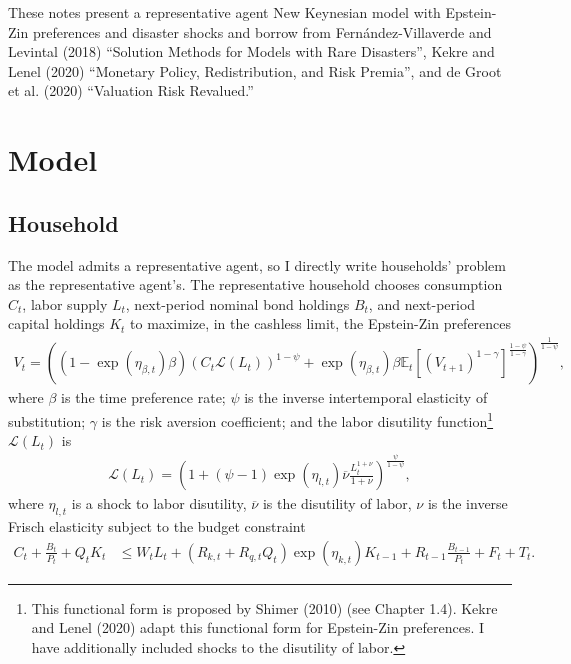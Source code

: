 \documentclass[12 pt, oneside]{article}
\theoremstyle{definition}
\theoremstyle{definition}
\theoremstyle{definition}
\newcommand{\E}{\mathbb{E}}
\newcommand{\calL}{\mathcal{L}}
\begin{document}
These notes present a representative agent New Keynesian model with Epstein-Zin preferences and disaster shocks and borrow from Fern{\'a}ndez-Villaverde and Levintal (2018) ``Solution Methods for Models with Rare Disasters'', Kekre and Lenel (2020) ``Monetary Policy, Redistribution, and Risk Premia'', and de Groot et al. (2020) ``Valuation Risk Revalued.''

\section{Model}\label{sec:model}

\subsection{Household}

The model admits a representative agent, so I directly write households' problem as the representative agent's. The representative household chooses consumption $C_t$, labor supply $L_t$, next-period nominal  bond holdings $B_t$, and next-period capital holdings $K_t$ to maximize, in the cashless limit, the Epstein-Zin preferences
\begin{align}\label{eq:hh objective}
  V_t = \left((1 - \exp(\eta_{\beta, t})\beta)\left(C_t \calL(L_t)\right)^{1 - \psi} + \exp(\eta_{\beta, t})\beta \E_t\left[\left(V_{t + 1}\right)^{1 - \gamma}\right]^{\frac{1 - \psi}{1 - \gamma}}\right)^{\frac{1}{1 - \psi}},
\end{align}
where $\beta$ is the time preference rate; $\psi$ is the inverse intertemporal elasticity of substitution; $\gamma$ is the risk aversion coefficient; and
the labor disutility function\footnote{This functional form is proposed by Shimer (2010) (see Chapter 1.4). Kekre and Lenel (2020) adapt this functional form for Epstein-Zin preferences. I have additionally included shocks to the disutility of labor.} $\calL(L_t)$ is
\begin{align}
  \calL(L_t) = \left(1 + (\psi - 1)\exp(\eta_{l, t})\overline{\nu}\frac{L_t^{1  + \nu}}{1 + \nu}\right)^{\frac{\psi}{1 - \psi}},
\end{align}
where $\eta_{l, t}$ is a shock to labor disutility, $\overline{\nu}$ is the disutility of labor, $\nu$ is the inverse Frisch elasticity
subject to the budget constraint
\begin{align}\label{eq:hh budget constraint}
  C_t + \frac{B_t}{P_t} + Q_tK_t & \leq W_t L_t + (R_{k, t} + R_{q, t}Q_t)\exp(\eta_{k, t}) K_{t - 1} + R_{t - 1} \frac{B_{t - 1}}{P_t} + F_t + T_t.
\end{align}
\end{document}
